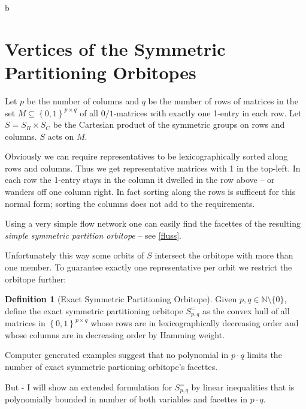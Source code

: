 b\documentclass[a4paper]{amsart}
\theoremstyle{definition}
\newtheorem{defn}{Definition}
\begin{document}
\section{Vertices of the Symmetric Partitioning Orbitopes}
Let $p$ be the number of columns and $q$ be the number of rows of
matrices in the set \(M \subseteq \left\{0,1\right\}^{p\times q}\) of all
$0/1$-matrices with exactly one 1-entry in each row.  Let \(S = S_R
\times S_C\) be the Cartesian product of the symmetric groups on rows
and columns.  \(S\) acts on \(M\).


Obviously we can require representatives to be lexicographically
sorted along rows and columns.  Thus we get representative matrices
with 1 in the top-left.  In each row the 1-entry stays in the column
it dwelled in the row above -- or wanders off one column right.  In
fact sorting along the rows is sufficent for this normal form; sorting
the columns does not add to the requirements.

Using a very simple flow network one can easily find the facettes of
the resulting \textit{simple symmetric partition orbitope} -- see
\ref{fluss}.


Unfortunately this way some orbits of $S$ intersect the orbitope with
more than one member.  To guarantee exactly one representative per
orbit we restrict the orbitope further:

\begin{defn}[Exact Symmetric Partitioning Orbitope]
  \label{espo}
  Given \(p, q \in \mathbb{N} \setminus \{0\}\), define the exact
  symmetric partitioning orbitope \(S^=_{p,q}\) as the convex hull of
  all matrices in \(\left\{0,1\right\}^{p\times q}\) whose rows are in
  lexicographically decreasing order and whose columns are in
  decreasing order by Hamming weight.
\end{defn}

Computer generated examples suggest that no polynomial in \(p \cdot
q\) limits the number of exact symmetric partioning orbitope's
facettes.

But - I will show an extended formulation for \(S^=_{p,q}\) by linear
inequalities that is polynomially bounded in number of both variables
and facettes in \(p \cdot q\).


\end{document}
